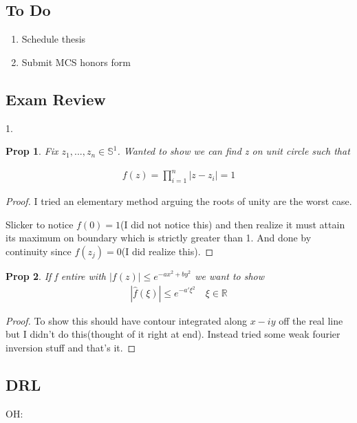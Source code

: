 \documentclass[11pt]{article}
\newcommand{\R}{\mathbb{R}}
\newtheorem{prop}{Prop}
\theoremstyle{remark}
\begin{document}
\subsection{To Do}

\begin{enumerate}
	\item Schedule thesis 
	\item Submit MCS honors form
\end{enumerate}

\subsection{Exam Review}

1. 
\begin{prop}
Fix $z_1,...,z_n \in \mathbb{S}^1$. Wanted to show we can find z on unit circle such that

\begin{align*}
	f(z) = \prod_{i=1}^n |z-z_i| = 1
\end{align*}

\end{prop}

\begin{proof}
	I tried an elementary method arguing the roots of unity are the worst case.

	Slicker to notice $f(0) = 1$(I did not notice this) and then realize it must attain its maximum on boundary which is strictly greater than 1. And done by continuity since $f(z_j) = 0$(I did realize this). 
\end{proof}

\begin{prop}
	If f entire with $|f(z)| \leq e^{-ax^2+by^2}$ we want to show
	\begin{align*}
		|\hat{f}(\xi)| \leq e^{-a'\xi^2} \quad \xi \in \R
	\end{align*}
\end{prop}

\begin{proof}
	To show this should have contour integrated along $x-iy$ off the real line but I didn't do this(thought of it right at end). Instead tried some weak fourier inversion stuff and that's it.
\end{proof}

\subsection{DRL}

OH:
\end{document}
